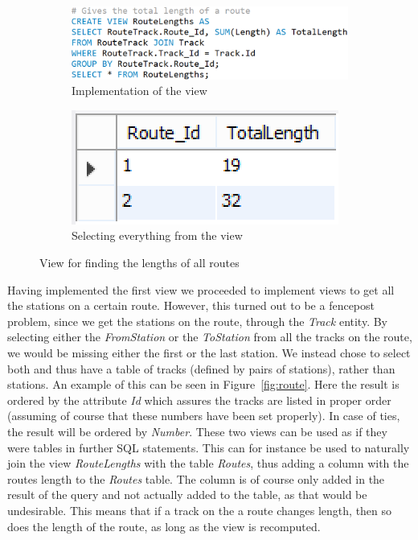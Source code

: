 \begin{figure}[h]
    \centering
    \begin{subfigure}[b]{0.45 \textwidth}
        \centering
        \includegraphics[width=\textwidth]{img/RouteLengths}
        \caption{Implementation of the view}
    \end{subfigure}
    \begin{subfigure}[b]{0.45 \textwidth}
        \centering
        \includegraphics{img/RouteLengthsView}
        \caption{Selecting everything from the view}
    \end{subfigure}
    \caption{View for finding the lengths of all routes}
    \label{fig:length}
\end{figure}

Having implemented the first view we proceeded to implement views to get all 
the stations on a certain route. However, this turned out to be a fencepost 
problem, since we get the stations on the route, through the \emph{Track} 
entity. By selecting either the \emph{FromStation} or the \emph{ToStation} from 
all the tracks on the route, we would be missing either the first or the last 
station. We instead chose to select both and thus have a table of tracks 
(defined by pairs of stations), rather than stations. An example of this can be 
seen in Figure~\ref{fig:route}. Here the result is ordered by the attribute 
\emph{Id} which assures the tracks are listed in proper order (assuming of 
course that these numbers have been set properly). In case of ties, the result will be ordered by \emph{Number}. These two views can be used 
as if they were tables in further SQL statements. This can for instance be used 
to naturally join the view \emph{RouteLengths} with the table \emph{Routes}, 
thus adding a column with the routes length to the \emph{Routes} table. The 
column is of course only added in the result of the query and not actually 
added to the table, as that would be undesirable. This means that if a track on 
the a route changes length, then so does the length of the route, as long as 
the view is recomputed.


